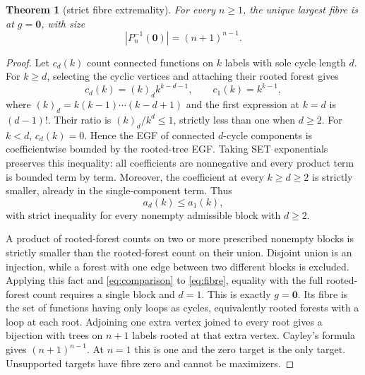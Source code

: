 \documentclass[a4paper,10pt]{amsart}
\newtheorem{theorem}{Theorem}[section]
\theoremstyle{remark}
\newcommand{\zero}{\boldsymbol 0}
\begin{document}
\begin{theorem}[strict fibre extremality]\label{thm:maxfibre}
For every $n\ge1$, the unique largest fibre is at $g=\zero$, with size
\begin{equation}\label{eq:maxfibre}
 |P_n^{-1}(\zero)|=(n+1)^{n-1}.
\end{equation}
\end{theorem}
\begin{proof}
Let $c_d(k)$ count connected functions on $k$ labels with sole cycle
length $d$. For $k\ge d$, selecting the cyclic vertices and attaching
their rooted forest gives
\begin{equation}\label{eq:connected}
 c_d(k)=(k)_d k^{k-d-1},\qquad c_1(k)=k^{k-1},
\end{equation}
where $(k)_d=k(k-1)\cdots(k-d+1)$ and the first expression at $k=d$
is $(d-1)!$. Their ratio is $(k)_d/k^d\le1$, strictly less than one
when $d\ge2$. For $k<d$, $c_d(k)=0$. Hence the EGF of connected
$d$-cycle components is coefficientwise bounded by the rooted-tree EGF.
Taking SET exponentials preserves this inequality: all coefficients are
nonnegative and every product term is bounded term by term. Moreover,
the coefficient at every $k\ge d\ge2$ is strictly smaller, already in
the single-component term. Thus
\begin{equation}\label{eq:comparison}
 a_d(k)\le a_1(k),
\end{equation}
with strict inequality for every nonempty admissible block with $d\ge2$.

A product of rooted-forest counts on two or more prescribed nonempty
blocks is strictly smaller than the rooted-forest count on their union.
Disjoint union is an injection, while a forest with one edge between two
different blocks is excluded. Applying this fact and
\eqref{eq:comparison} to \eqref{eq:fibre}, equality with the full
rooted-forest count requires a single block and $d=1$. This is exactly
$g=\zero$. Its fibre is the set of functions having only loops as
cycles, equivalently rooted forests with a loop at each root. Adjoining
one extra vertex joined to every root gives a bijection with trees on
$n+1$ labels rooted at that extra vertex. Cayley's formula gives
$(n+1)^{n-1}$. At $n=1$ this is one and the zero target is the only target.
Unsupported targets have fibre zero and cannot be maximizers.
\end{proof}
\end{document}

